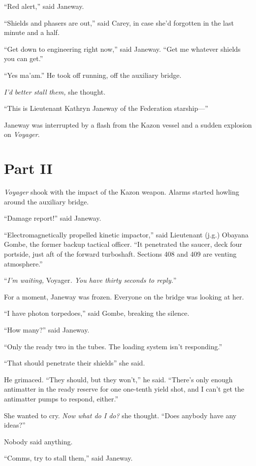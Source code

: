 \documentclass[twoside,letterpaper,12pt]{memoir}
\begin{document}
``Red alert,'' said Janeway.

``Shields and phasers are out,'' said Carey, in case she’d forgotten in the last minute and a half.

``Get down to engineering right now,'' said Janeway. ``Get me whatever shields you can get.''

``Yes ma'am.'' He took off running, off the auxiliary bridge.

\textit{I'd better stall them, }she thought.

``This is Lieutenant Kathryn Janeway of the Federation starship---''

Janeway was interrupted by a flash from the Kazon vessel and a sudden explosion on \textit{Voyager}.

\chapter*{Part II}

\textit{Voyager} shook with the impact of the Kazon weapon. Alarms started howling around the auxiliary bridge.

``Damage report!'' said Janeway.

``Electromagnetically propelled kinetic impactor,'' said Lieutenant (j.g.) Obayana Gombe, the former backup tactical officer. ``It penetrated the saucer, deck four portside, just aft of the forward turboshaft. Sections 408 and 409 are venting atmosphere.''

``\textit{I'm waiting, }Voyager\textit{. You have thirty seconds to reply.}''

For a moment, Janeway was frozen. Everyone on the bridge was looking at her.

``I have photon torpedoes,'' said Gombe, breaking the silence.

``How many?'' said Janeway.

``Only the ready two in the tubes. The loading system isn't responding.''

``That should penetrate their shields'' she said.

He grimaced. ``They should, but they won't,'' he said. ``There's only enough antimatter in the ready reserve for one one-tenth yield shot, and I can't get the antimatter pumps to respond, either.''

She wanted to cry. \textit{Now what do I do?} she thought. ``Does anybody have any ideas?''

Nobody said anything.

``Comms, try to stall them,'' said Janeway.
\end{document}
